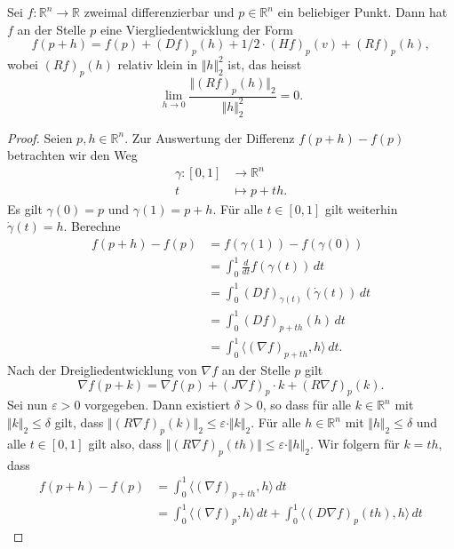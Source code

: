 \documentclass[../main.tex]{subfiles}
\begin{document}
\begin{proposition}[Viergliedentwicklung]
  Sei $f \colon \mathbb{R}^n \to \mathbb{R}$ zweimal differenzierbar
  und $p \in \mathbb{R}^n$ ein beliebiger Punkt.
  Dann hat $f$ an der Stelle $p$ eine Viergliedentwicklung
  der Form
  \[
    f(p + h) = f(p) + {(Df)}_p(h) + 1/2 \cdot {(Hf)}_p (v) + {(Rf)}_p(h),
  \]
  wobei ${(Rf)}_p(h)$ relativ klein in $\Vert h \Vert_2^2$ ist,
  das heisst
  \[
    \lim_{h \to 0} \frac{\Vert {(Rf)}_p(h) \Vert_2}{\Vert h \Vert_2^2} = 0.
  \]
\end{proposition}

\begin{proof}
  Seien $p, h \in \mathbb{R}^n$.
  Zur Auswertung der Differenz
  $f(p + h) - f(p)$ betrachten wir den
  Weg 
  \begin{align*}
    \gamma \colon [0, 1] & \to \mathbb{R}^n \\
    t & \mapsto p + th.
  \end{align*}
  Es gilt $\gamma(0) = p$ und $\gamma(1) = p + h$.
  Für alle $t \in [0, 1]$ gilt weiterhin $\dot \gamma(t) = h$.
  Berechne
  \begin{align*}
   f(p + h) - f(p)    
   &= f( \gamma(1))  -f(\gamma(0))  \\
   &= \int_{0}^{1} \frac{d}{dt} f(\gamma(t)) \, dt \\
   &= \int_{0}^{1} {(Df)}_{\gamma(t)}( \dot \gamma(t)) \, dt \\
   &= \int_{0}^{1} {(Df)}_{p + th}(h) \, dt \\
   &= \int_{0}^{1} \langle {(\nabla f)}_{p + th}, h \rangle \, dt.
  \end{align*}
  Nach der Dreigliedentwicklung von $\nabla f$ an der Stelle $p$ gilt
  \[
    \nabla f (p + k ) = \nabla f(p) + {(J \nabla f)}_p \cdot k +
    {(R \nabla f)}_p (k).
  \]
  Sei nun $\varepsilon > 0$ vorgegeben.
  Dann existiert $\delta > 0$,
  so dass für alle $k \in \mathbb{R}^n$ mit $\Vert k \Vert_2 \leq \delta$ 
  gilt, dass $\Vert {(R \nabla f)}_p(k) \Vert_2 \leq \varepsilon \cdot
  \Vert k \Vert_2$.
  Für alle $h \in \mathbb{R}^n$ mit $\Vert h \Vert_2 \leq \delta$ 
  und alle $t \in [0, 1]$ gilt also, dass
  $\Vert {(R \nabla f)}_p (th) \Vert \leq \varepsilon \cdot \Vert h \Vert_2$.
  Wir folgern für $k = th$, dass
  \begin{align*}
    f(p + h) - f(p)
    & = \int_{0}^{1} \langle {(\nabla f)}_{p + th}, h \rangle \, dt\\
    &= \int_{0}^{1} \langle {(\nabla f)}_p , h \rangle \, dt
    + \int_{0}^{1} \langle {(D \nabla f)}_p (th), h \rangle \, dt

\end{align*}
\end{proof}
\end{document}
